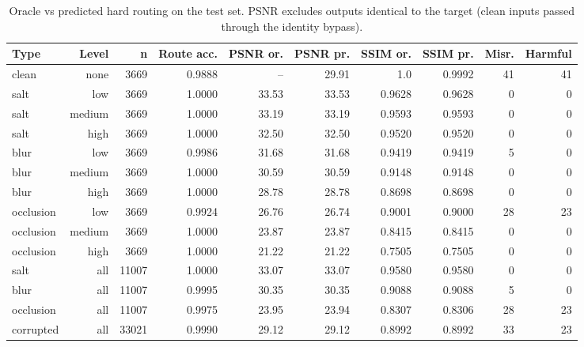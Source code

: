 \begin{table}[t]
\centering
\caption{Oracle vs predicted hard routing on the test set. PSNR excludes outputs identical to the target (clean inputs passed through the identity bypass).}
\label{tab:t2_oracle_vs_predicted}
\begin{tabular}{lrrrrrrrrr}
\toprule
Type & Level & n & Route acc. & PSNR or. & PSNR pr. & SSIM or. & SSIM pr. & Misr. & Harmful \\
\midrule
clean & none & 3669 & 0.9888 & -- & 29.91 & 1.0 & 0.9992 & 41 & 41 \\
salt & low & 3669 & 1.0000 & 33.53 & 33.53 & 0.9628 & 0.9628 & 0 & 0 \\
salt & medium & 3669 & 1.0000 & 33.19 & 33.19 & 0.9593 & 0.9593 & 0 & 0 \\
salt & high & 3669 & 1.0000 & 32.50 & 32.50 & 0.9520 & 0.9520 & 0 & 0 \\
blur & low & 3669 & 0.9986 & 31.68 & 31.68 & 0.9419 & 0.9419 & 5 & 0 \\
blur & medium & 3669 & 1.0000 & 30.59 & 30.59 & 0.9148 & 0.9148 & 0 & 0 \\
blur & high & 3669 & 1.0000 & 28.78 & 28.78 & 0.8698 & 0.8698 & 0 & 0 \\
occlusion & low & 3669 & 0.9924 & 26.76 & 26.74 & 0.9001 & 0.9000 & 28 & 23 \\
occlusion & medium & 3669 & 1.0000 & 23.87 & 23.87 & 0.8415 & 0.8415 & 0 & 0 \\
occlusion & high & 3669 & 1.0000 & 21.22 & 21.22 & 0.7505 & 0.7505 & 0 & 0 \\
salt & all & 11007 & 1.0000 & 33.07 & 33.07 & 0.9580 & 0.9580 & 0 & 0 \\
blur & all & 11007 & 0.9995 & 30.35 & 30.35 & 0.9088 & 0.9088 & 5 & 0 \\
occlusion & all & 11007 & 0.9975 & 23.95 & 23.94 & 0.8307 & 0.8306 & 28 & 23 \\
corrupted & all & 33021 & 0.9990 & 29.12 & 29.12 & 0.8992 & 0.8992 & 33 & 23 \\
\bottomrule
\end{tabular}
\end{table}
